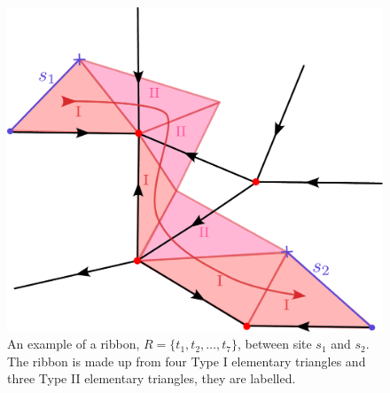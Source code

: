 \documentclass[two column]{article}
\newcommand{\caro}[1]{\textcolor{red}{[#1]}}
\begin{document}
\begin{figure}
    \centering
    \includegraphics[width= \linewidth]{Figures/ribbon_exampl.pdf}
    \caption{An example of a ribbon, $R = \{t_1, t_2, \ldots, t_7\}$, between site $s_1$ and $s_2$. The ribbon is made up from four Type I elementary triangles and three Type II elementary triangles, they are labelled.}
    \label{fig:rib_exampl}
\end{figure}


\end{document}
